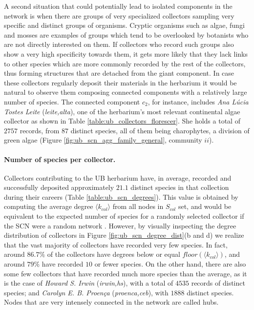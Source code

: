 A second situation that could potentially lead to isolated components in the network is when there are groups of very specialized collectors sampling very specific and distinct groups of organisms. 
Cryptic organisms such as algae, fungi and mosses are examples of groups which tend to be overlooked by botanists who are not directly interested on them. 
If collectors who record such groups also show a very high specificity towards them, it gets more likely that they lack links to other species which are more commonly recorded by the rest of the collectors, thus forming structures that are detached from the giant component. 
In case these collectors regularly deposit their materials in the herbarium it would be natural to observe them composing connected components with a relatively large number of species.
The connected component $c_2$, for instance, includes \textit{Ana Lúcia Tostes Leite} (\textit{leite,alta}), one of the herbarium's most relevant continental algae collector as shown in Table \ref{table:ub_collectors_florescer}.
She holds a total of $2757$ records, from $87$ distinct species, all of them being charophytes, a division of green algae (Figure \ref{fig:ub_scn_agg_family_general}, community $ii$).



\paragraph*{Number of species per collector.}
Collectors contributing to the UB herbarium have, in average, recorded and successfully deposited approximately $21.1$ distinct species in that collection during their careers (Table \ref{table:ub_scn_degrees}). This value is obtained by computing the average degree $\langle k_{col} \rangle$ from all nodes in $S_{col}$ set, and would be equivalent to the expected number of species for a randomly selected collector if the SCN were a random network \cite{Albert2002}.
However, by visually inspecting the degree distribution of collectors in Figure \ref{fig:ub_scn_degree_dist}(b and d) we realize that the vast majority of collectors have recorded very few species. In fact, around $86.7\%$ of the collectors have degrees below or equal $floor(\langle k_{col} \rangle)$, and around $79\%$ have recorded $10$ or fewer species.
On the other hand, there are also some few collectors that have recorded much more species than the average, as it is the case of \textit{Howard S. Irwin} (\textit{irwin,hs}), with a total of $4535$ records of distinct species; and \textit{Carolyn E. B. Proença} (\textit{proenca,ceb}), with $1888$ distinct species. Nodes that are very intensely connected in the network are called hubs.

